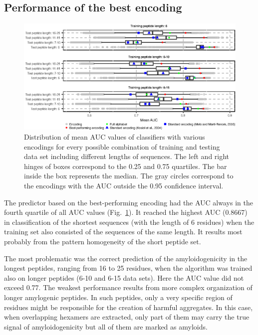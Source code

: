 \documentclass[fleqn,10pt,twoside]{gcb15submission}
\begin{document}
\subsection{Performance of the best encoding}

\begin{figure}[h]
\centerline{\includegraphics{figures/AUC_boxplot.eps}}
\caption{Distribution of mean AUC values of classifiers with various encodings 
for every possible combination of training and testing data set including 
different lengths of sequences. The left and right hinges of boxes correspond 
to 
the 0.25 and 0.75 quartiles. The bar inside the box represents the median. The 
gray circles correspond to the encodings with the AUC outside the 0.95 
confidence interval. 
}\label{fig:AUC_boxplot}

\end{figure}

The predictor based on the best-performing encoding had the AUC always in the 
fourth quartile of all AUC values (Fig.~\ref{fig:AUC_boxplot}). It reached the 
highest AUC (0.8667) in classification of the shortest sequences (with the 
length of 6 residues) when the training set also consisted of the sequences of 
the same length. It results most probably from the pattern homogeneity of the 
short peptide set. 

  The most problematic was the correct prediction of the amyloidogenicity in the 
longest peptides, ranging from 16 to 25 residues, when the algorithm was trained 
also on longer peptides (6-10 and 6-15 data sets). Here the AUC value did not 
exceed 0.77. The weakest performance results from more complex organization of 
longer amylogenic peptides. In such peptides, only a very specific region of 
residues might be responsible for the creation of harmful aggregates. In this 
case, when overlapping hexamers are extracted, only part of them may carry the 
true signal of amyloidogenicity but all of them are marked as amyloids. 
\end{document}
